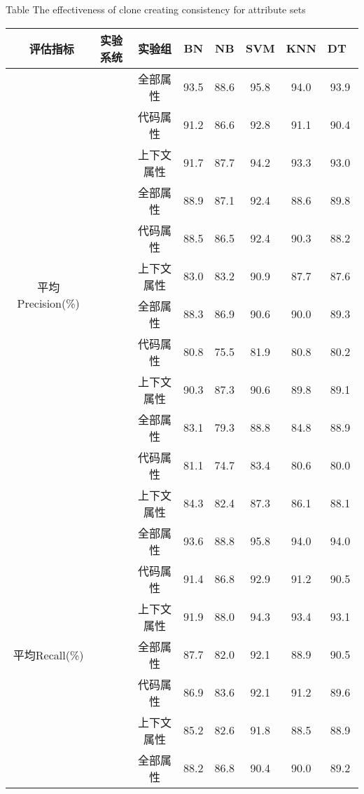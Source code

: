 \begin{table} [htbp]
\renewcommand\arraystretch{0.9} 
{Table$\!$}
{The effectiveness of clone creating consistency for attribute sets}
\vspace{0.5em}
\centering
\wuhao
\begin{tabular}{cccccccc}
\toprule[1.5pt]
~{评估指标}&{实验系统}&{实验组}&{BN}&{NB}&{SVM}&{KNN}&{DT}~\\
\midrule[1pt]
\multirow{12}{*}{平均Precision(\%)}
&~\multirow{3}{*}{ArgoUML}
&全部属性& 93.5    & 88.6  &95.8 & 94.0  & 93.9 \\
& & 代码属性& 91.2    & 86.6  & 92.8 & 91.1 & 90.4 \\
&  & 上下文属性& 91.7    & 87.7  & 94.2 & 93.3 &93.0  \\
&~\multirow{3}{*}{jEdit}
& 全部属性& 88.9    & 87.1  & 92.4 &88.6 & 89.8 \\
&    &代码属性& 88.5    & 86.5  & 92.4 & 90.3 & 88.2 \\
&    &  上下文属性 & 83.0     &83.2  & 90.9 & 87.7 & 87.6 \\
&~\multirow{3}{*}{jFreeChart}
& 全部属性& 88.3    & 86.9  &90.6 &90.0  & 89.3 \\
&  &代码属性 & 80.8    & 75.5  & 81.9 & 80.8 & 80.2 \\
&  & 上下文属性& 90.3    & 87.3  & 90.6 & 89.8 & 89.1 \\
&~\multirow{3}{*}{Tuxguitar} 
&全部属性 & 83.1    & 79.3  & 88.8 & 84.8 & 88.9 \\
&   &代码属性& 81.1    & 74.7  & 83.4 & 80.6 & 80.0   \\
&    &  上下文属性& 84.3    & 82.4  & 87.3 & 86.1 & 88.1 \\
\multirow{12}{*}{平均Recall(\%)}&
~\multirow{3}{*}{ArgoUML}
&全部属性 & 93.6    & 88.8  & 95.8 & 94.0  & 94.0  \\
&   &代码属性 & 91.4    & 86.8  & 92.9 & 91.2 & 90.5 \\
&   &  上下文属性& 91.9    & 88.0   & 94.3 & 93.4 & 93.1 \\
&~\multirow{3}{*}{jEdit}
& 全部属性& 87.7    & 82.0   & 92.1 & 88.9 & 90.5 \\
&   &代码属性 & 86.9    & 83.6  & 92.1 & 91.2 & 89.6 \\
&   &  上下文属性& 85.2    & 82.6  & 91.8 & 88.5 & 88.9 \\
&~\multirow{3}{*}{jFreeChart} 
 & 全部属性 & 88.2    & 86.8  & 90.4 & 90.0   & 89.2 \\

\end{tabular}
\end{table}
